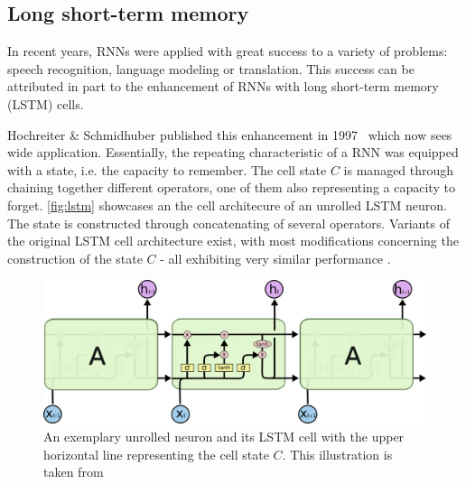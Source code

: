 \subsection{Long short-term memory}\label{sec:lstm}
In recent years, RNNs were applied with great success to a variety of problems: speech recognition, language modeling or translation. This success can be attributed in part to the enhancement of RNNs with long short-term memory (LSTM) cells.

Hochreiter \& Schmidhuber published this enhancement in 1997~\cite{hochreiter1997} which now sees wide application. Essentially, the repeating characteristic of a RNN was equipped with a state, i.e. the capacity to remember. The cell state $C$ is managed through chaining together different operators, one of them also representing a capacity to forget. \autoref{fig:lstm} showcases an the cell architecure of an unrolled LSTM neuron. The state is constructed through concatenating of several operators. Variants of the original LSTM cell architecture exist, with most modifications concerning the construction of the state $C$ - all exhibiting very similar performance \cite{greff2017lstm}.

\begin{figure}[ht!]
    \centering
    \includegraphics[width=.8\textwidth]{gfx/lstm-chain.png}
    \caption[An unrolled LSTM cell and its internals]{An exemplary unrolled neuron and its LSTM cell with the upper horizontal line representing the cell state $C$. This illustration is taken from \cite{web:colah}}
    \label{fig:lstm}
\end{figure}

